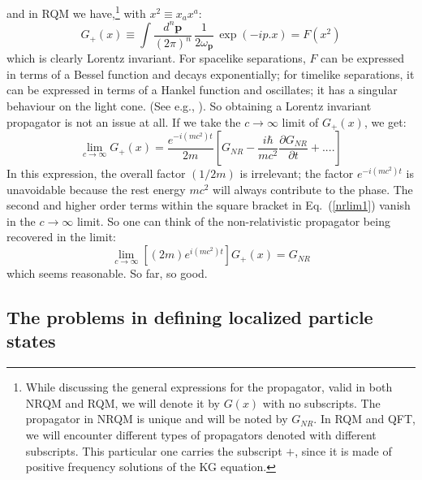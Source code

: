 \documentclass{article}
\def\eq#1{{Eq.~(\ref{#1})}}
\begin{document}
and in RQM we have,\footnote{While discussing the general expressions for the propagator, valid in both NRQM and RQM, we will denote it by $G(x)$ with no subscripts. The propagator in NRQM is unique and will be noted by $G_{NR}$. In RQM and QFT, we will encounter different types of propagators denoted with different subscripts. This particular one carries the subscript $+$, since it is made of positive frequency solutions of the KG equation.} with $x^2 \equiv x_a x^a$:
\begin{equation}
 G_+(x)\equiv 
\int  \frac{d^n\bm{p}}{(2\pi)^n}\,\frac{1}{2\omega_{\bm{p}}} \, \exp(- i p.x)=F(x^2)
 \label{rqmg}
\end{equation}
which is clearly Lorentz invariant. For spacelike separations, $F$ can be expressed in terms of a Bessel function and decays exponentially; for timelike separations, it can be expressed in terms of a Hankel function and oscillates; it has a singular behaviour on the light cone. (See e.g., \cite{tpqft}). So obtaining a Lorentz invariant propagator is not an issue at all. If we take the $c\to\infty$ limit of 
$ G_+(x)$, we get:
\begin{equation}
 \lim_{c\to\infty}G_+(x)=\frac{e^{-i(mc^2)t}}{2m}\left[G_{NR}-\frac{i\hbar}{mc^2}\frac{\partial G_{NR}}{\partial t}+ ....\right]
 \label{nrlim1}
\end{equation} 
In this expression, the overall factor $(1/2m)$ is irrelevant; the factor $e^{-i(mc^2)t}$ is unavoidable because the rest energy $mc^2$ will always contribute  to the phase. The second and higher order terms within the  square bracket in \eq{nrlim1} vanish in the $c\to\infty$ limit. So one can think of the non-relativistic propagator being recovered  in the limit:
\begin{equation}
 \lim_{c\to\infty} [(2m) e^{i(mc^2)t}]G_+(x)=G_{NR}
 \label{plustonr}
\end{equation} 
which seems reasonable.
So far, so good.

\subsection{The problems in defining localized particle states}
\end{document}
